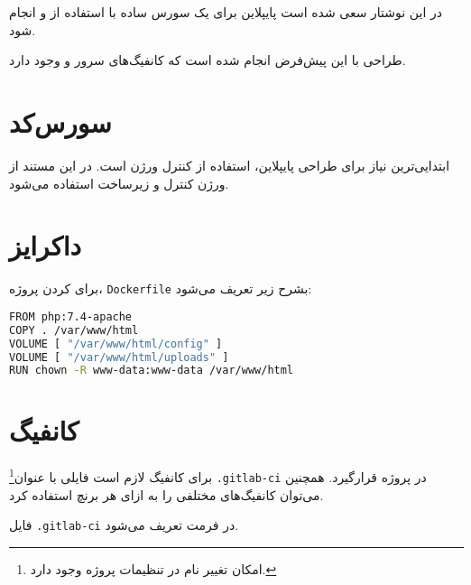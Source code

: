 در این نوشتار سعی شده است
پایپلاین
برای
یک سورس 
ساده
 با استفاده از 
و
انجام شود.

طراحی با این پیش‌فرض انجام‌ شده است که 
کانفیگ‌های
سرور
و
وجود دارد.

\section{سورس‌کد}
ابتدایی‌ترین نیاز برای طراحی پایپلاین، استفاده از کنترل ورژن است. در این مستند از ورژن کنترل
و
زیرساخت 
استفاده می‌شود.



\section{داکرایز}
برای 
کردن پروژه،
\texttt{Dockerfile}
بشرح زیر تعریف می‌شود:

\begin{latin}
\begin{lstlisting}[language=Bash]
FROM php:7.4-apache 
COPY . /var/www/html
VOLUME [ "/var/www/html/config" ]
VOLUME [ "/var/www/html/uploads" ]
RUN chown -R www-data:www-data /var/www/html
\end{lstlisting}
\end{latin}


\section{کانفیگ }
برای کانفیگ
 لازم است فایلی با 
 عنوان\footnote{امکان تغییر نام در تنظیمات پروژه وجود دارد.}
 \texttt{.gitlab-ci}
 در پروژه قرارگیرد.
همچنین می‌توان کانفیگ‌های مختلفی را به ازای هر برنچ استفاده کرد. 

فایل 
 \texttt{.gitlab-ci}
 در فرمت
 تعریف می‌شود.
 
